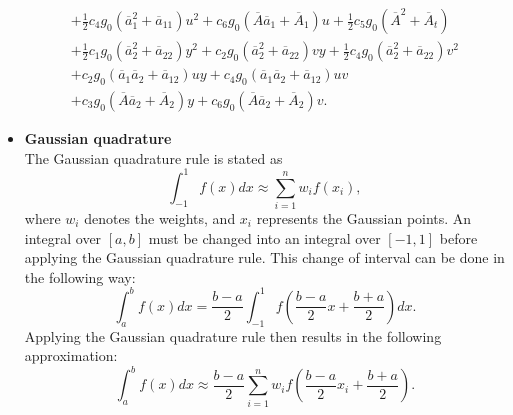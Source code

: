 \documentclass[review]{elsarticle}
\begin{document}
\begin{itemize}
\begin{equation}
\begin{gathered}
		+\frac{1}{2}c_4g_0\left(\overline{a}_1^2+\overline{a}_{11}\right)u^2
		+c_6g_0\left(\overline{A}\overline{a}_1+\overline{A}_1\right)u
		+\frac{1}{2}c_5g_0\left(\overline{A}^2+\overline{A}_t\right)\\
		+\frac{1}{2}c_1g_0\left(\overline{a}^2_2+\overline{a}_{22}\right)y^2
		+c_2g_0\left(\overline{a}^2_2+\overline{a}_{22}\right)vy
		+\frac{1}{2}c_4g_0\left(\overline{a}^2_2+\overline{a}_{22}\right)v^2 \\
		+c_2g_0\left(\overline{a}_1\overline{a}_2+\overline{a}_{12}\right)uy
		+c_4g_0\left(\overline{a}_1\overline{a}_2+\overline{a}_{12}\right)uv \\
		+c_3g_0\left(\overline{A}\overline{a}_2+\overline{A}_2\right)y
		+c_6g_0\left(\overline{A}\overline{a}_2+\overline{A}_2\right)v.
	\end{gathered}
	\end{equation}
	\item \textbf{Gaussian quadrature}\\
	The Gaussian quadrature rule is stated as 
	\begin{equation}\label{Gaussian-quadrature1}
		\int_{-1}^{1}f(x)dx \approx \sum_{i=1}^{n}w_if(x_i),
	\end{equation}
	where $w_i$ denotes the weights, and $x_i$ represents the Gaussian points. An integral over $[a, b]$ must be changed into an integral over $[-1, 1]$ before applying the Gaussian quadrature rule. This change of interval can be done in the following way:
	\begin{equation}\label{Gaussian-quadrature2}
		\int_{a}^{b}f(x)dx = \frac{b-a}{2}\int_{-1}^{1}f\left(\frac{b-a}{2}x+\frac{b+a}{2}\right)dx.
	\end{equation}
	Applying the Gaussian quadrature rule then results in the following approximation:
	\begin{equation}\label{Gaussian-quadrature3}
		\int_{a}^{b}f(x)dx \approx \frac{b-a}{2}\sum_{i=1}^{n}w_if\left(\frac{b-a}{2}x_i+\frac{b+a}{2}\right).
 	\end{equation}   
\end{itemize}
\end{document}
